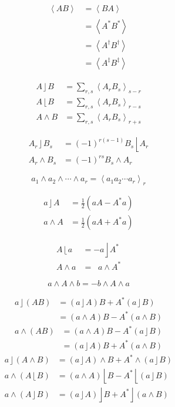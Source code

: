 \documentclass{utarticle}
\DeclareMathOperator{\lin}{\rfloor}
\DeclareMathOperator{\rin}{\lfloor}
\DeclareMathOperator{\out}{\wedge}
\newcommand{\grinv}[2][]{\ensuremath{#2^{*#1}}}
\newcommand{\rev}[1]{\ensuremath{#1^\dagger}}
\newcommand{\clifconj}[1]{\ensuremath{#1^\ddagger}}
\newcommand{\grade}[2][]{\ensuremath{\left\langle #2 \right\rangle_{#1}}}
\newcommand{\half}{\ensuremath{\frac{1}{2}}}
\begin{document}
\begin{align} 
\grade{A B} & = \grade{B A} \\
 & = \grade{\grinv{A} \grinv{B}} \\
 & = \grade{\rev{A} \rev{B}} \\
 & = \grade{\clifconj{A} \clifconj{B}}
\end{align}

\begin{align}
A \lin B & = \sum_{r,s} \grade[s-r]{A_r B_s} \\
A \rin B & = \sum_{r,s} \grade[r-s]{A_r B_s}  \\
A \out B & = \sum_{r,s} \grade[r+s]{A_r B_s}
\end{align}

\begin{align} 
A_r \lin B_s & = (-1)^{r(s-1)} B_s \rin A_r \\
A_r \out B_s & = (-1)^{rs} B_s \out A_r
\end{align}

\begin{equation}
a_1 \out a_2 \out \dotsb \out a_r = \grade[r]{a_1 a_2 \dotsb a_r}
\end{equation}

\begin{align}
a \lin A & = \half(a A - \grinv{A} a) \\
a \out A & = \half(a A + \grinv{A} a)
\end{align}

\begin{align}
A \rin  a & = -a \lin \grinv{A} \\
A \out a & = \ \, \, a \out \grinv{A}
\end{align}

\begin{equation}
a \out A \out b = -b \out A \out a
\end{equation}

\begin{align}
a \lin (A B) & = (a \lin A) B + \grinv{A} (a \lin B) \\
                   & = (a \out A) B - \grinv{A} (a \out B) 
\end{align}
\begin{align}
a \out (A B) & = (a \out A) B - \grinv{A} (a \lin B) \\
                   & = (a \lin A) B + \grinv{A} (a \out B)
\end{align}
\begin{align}
a \lin (A \out B) & = (a \lin A) \out B + \grinv{A} \out (a \lin B) \\
a \out (A \rin B) & = (a \out A) \rin B - \grinv{A} \rin (a \lin B) \\
a \out (A \lin B) & = (a \lin A) \lin B + \grinv{A} \lin (a \out B)
\end{align}
\end{document}
